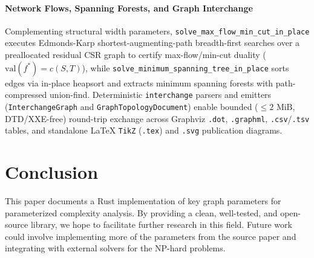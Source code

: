 \documentclass{article}
\begin{document}
\paragraph{Network Flows, Spanning Forests, and Graph Interchange} Complementing structural width parameters, \texttt{solve\_max\_flow\_min\_cut\_in\_place} executes Edmonds-Karp shortest-augmenting-path breadth-first searches over a preallocated residual CSR graph to certify max-flow/min-cut duality ($\text{val}(f^*) = c(S, T)$), while \texttt{solve\_minimum\_spanning\_tree\_in\_place} sorts edges via in-place heapsort and extracts minimum spanning forests with path-compressed union-find. Deterministic \texttt{interchange} parsers and emitters (\texttt{InterchangeGraph} and \texttt{GraphTopologyDocument}) enable bounded ($\le 2\text{ MiB}$, DTD/XXE-free) round-trip exchange across Graphviz \texttt{.dot}, \texttt{.graphml}, \texttt{.csv}/\texttt{.tsv} tables, and standalone \LaTeX{} \texttt{TikZ} (\texttt{.tex}) and \texttt{.svg} publication diagrams.

\section{Conclusion}
This paper documents a Rust implementation of key graph parameters for parameterized complexity analysis. By providing a clean, well-tested, and open-source library, we hope to facilitate further research in this field. Future work could involve implementing more of the parameters from the source paper and integrating with external solvers for the NP-hard problems.



\end{document}
